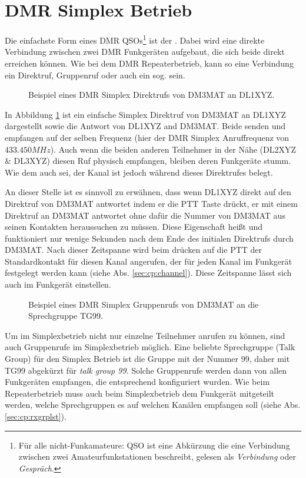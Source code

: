 \section{DMR Simplex Betrieb} \label{sec:simplex}
Die einfachste Form eines DMR QSOs\footnote{Für alle nicht-Funkamateure: QSO ist eine Abkürzung die eine Verbindung zwischen zwei Amateurfunkstationen beschreibt, gelesen als \emph{Verbindung} oder \emph{Gespräch}.} ist der . Dabei wird eine direkte Verbindung zwischen zwei DMR Funkgeräten aufgebaut, die sich beide direkt erreichen können. Wie bei dem DMR Repeaterbetrieb, kann so eine Verbindung ein Direktruf, Gruppenruf oder auch ein sog.  sein. 

\begin{figure}[!ht]
 \centering
 
 \caption{Beispiel eines DMR Simplex Direktrufs von DM3MAT an DL1XYZ.} \label{fig:splxpc}
\end{figure}

In Abbildung \ref{fig:splxpc} ist ein einfache Simplex Direktruf von DM3MAT an DL1XYZ dargestellt sowie die Antwort von DL1XYZ and DM3MAT. Beide senden und empfangen auf der selben Frequenz (hier der DMR Simplex Anruffrequenz von $433.450 MHz$). Auch wenn die beiden anderen Teilnehmer in der Nähe (DL2XYZ \& DL3XYZ) diesen Ruf physisch empfangen, bleiben deren Funkgeräte stumm. Wie dem auch sei, der Kanal ist jedoch während dieses Direktrufes belegt. 

An dieser Stelle ist es sinnvoll zu erwähnen, dass wenn DL1XYZ direkt auf den Direktruf von DM3MAT antwortet indem er die PTT Taste drückt, er mit einem Direktruf an DM3MAT antwortet ohne dafür die Nummer von DM3MAT aus seinen Kontakten heraussuchen zu müssen. Diese Eigenschaft heißt  und funktioniert nur wenige Sekunden nach dem Ende des initialen Direktrufs durch DM3MAT. Nach dieser Zeitspanne wird beim drücken auf die PTT der Standardkontakt für diesen Kanal angerufen, der für jeden Kanal im Funkgerät festgelegt werden kann (siehe Abs. \ref{sec:cp:channel}). Diese Zeitspanne lässt sich auch im Funkgerät einstellen.

\begin{figure}[!ht]
  \centering
  
  \caption{Beispiel eines DMR Simplex Gruppenrufs von DM3MAT an die Sprechgruppe TG99.} \label{fig:splxgc}
\end{figure}

Um im Simplexbetrieb nicht nur einzelne Teilnehmer anrufen zu können, sind auch Gruppenrufe im Simplexbetrieb möglich. Eine beliebte Sprechgruppe (Talk Group) für den Simplex Betrieb ist die Gruppe mit der Nummer 99, daher mit TG99 abgekürzt für \emph{talk group 99}. Solche Gruppenrufe werden dann von allen Funkgeräten empfangen, die entsprechend konfiguriert wurden. Wie beim Repeaterbetrieb muss auch beim Simplexbetrieb dem Funkgerät mitgeteilt werden, welche Sprechgruppen es auf welchen Kanälen empfangen soll (siehe Abs. \ref{sec:cp:rxgrplst}). 

